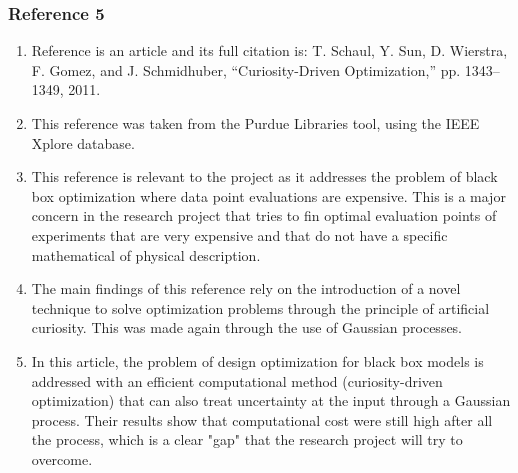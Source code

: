 \documentclass{journal}
\begin{document}
\subsubsection{Reference 5}
\begin{enumerate}
	\item Reference \cite{Schaul2011} is an article and its full citation is: T. Schaul, Y. Sun, D. Wierstra, F. Gomez, and J. Schmidhuber, “Curiosity-Driven Optimization,” pp. 1343–1349, 2011.
	\item This reference was taken from the Purdue Libraries tool, using the IEEE Xplore database.
	\item This reference is relevant to the project as it addresses the problem of black box optimization where data point evaluations are expensive. This is a major concern in the research project that tries to fin optimal evaluation points of experiments that are very expensive and that do not have a specific mathematical of physical description.
	\item The main findings of this reference rely on the introduction of a novel technique to solve optimization problems through the principle of artificial curiosity. This was made again through the use of Gaussian processes.
	\item In this article, the problem of design optimization for black box models is addressed with an efficient computational method (curiosity-driven optimization) that can also treat uncertainty at the input through a Gaussian process. Their results show that computational cost were still high after all the process, which is a clear "gap" that the research project will try to overcome.
\end{enumerate}
\end{document}
